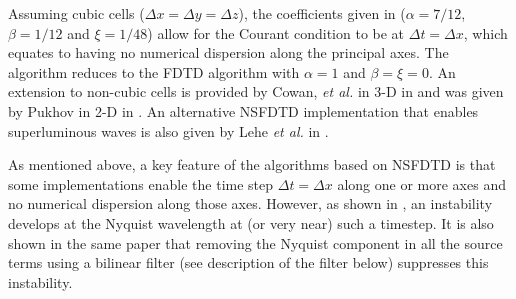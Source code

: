 Assuming cubic cells ($\Delta x=\Delta y=\Delta z$), the coefficients
given in \cite{KarkICAP06} ($\alpha=7/12$, $\beta=1/12$ and $\xi=1/48$)
allow for the Courant condition to be at $\Delta t=\Delta x$, which
equates to having no numerical dispersion along the principal axes.
The algorithm reduces to the FDTD algorithm with $\alpha=1$ and $\beta=\xi=0$.
An extension to non-cubic cells is provided by Cowan, \emph{et al.}
in 3-D in \cite{CowanPRSTAB13} and was given by Pukhov in 2-D in
\cite{PukhovJPP99}. An alternative NSFDTD implementation that enables superluminous waves is also
given by Lehe {\it et al.} in \cite{LehePRSTAB13}. 

As mentioned above, a key feature of the algorithms based on NSFDTD
is that some implementations \cite{KarkICAP06,CowanPRSTAB13} enable the time step $\Delta t=\Delta x$ along one or
more axes and no numerical dispersion along those axes. However, as
shown in \cite{VayJCP2011}, an instability develops at the Nyquist
wavelength at (or very near) such a timestep. It is also shown in
the same paper that removing the Nyquist component in all the source
terms using a bilinear filter (see description of the filter below)
suppresses this instability.

